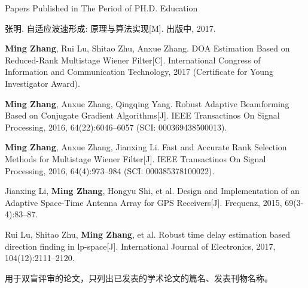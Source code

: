 
{} {Papers Published in The Period of PH.D. Education}

\begin{publist}
\item {\hei 张明}. 自适应波速形成: 原理与算法实现[M]. 出版中, 2017. 
%
\item {\bfseries Ming Zhang}, Rui Lu, Shitao Zhu, Anxue Zhang. DOA Estimation Based on 
Reduced-Rank Multistage Wiener Filter[C]. International Congress of Information and 
Communication Technology, 2017 (Certificate for Young Investigator Award).
%
\item {\bfseries Ming Zhang}, Anxue Zhang, Qingqing Yang. Robust Adaptive Beamforming Based on Conjugate Gradient Algorithms[J]. IEEE Transactinos On Signal Processing, 2016, 64(22):6046--6057 (SCI: 000369438500013).
%
\item {\bfseries Ming Zhang}, Anxue Zhang, Jianxing Li. Fast and Accurate Rank Selection Methods for Multistage Wiener Filter[J]. IEEE Transactinos On Signal Processing, 2016, 64(4):973--984 (SCI: 000385378100022).
%
\item Jianxing Li, {\bfseries Ming Zhang}, Hongyu Shi, et al. Design and Implementation of an Adaptive Space-Time Antenna Array for GPS Receivers[J]. Frequenz, 2015, 69(3-4):83--87.
%
\item Rui Lu, Shitao Zhu, {\bfseries Ming Zhang}, et al. Robust time delay estimation based direction finding in lp-space[J]. International Journal of Electronics, 2017, 104(12):2111--2120.
\end{publist}

\vspace{4em}
{\color{red} 用于双盲评审的论文，只列出已发表的学术论文的篇名、发表刊物名称。}

\clearpage{\pagestyle{empty}\cleardoublepage}
